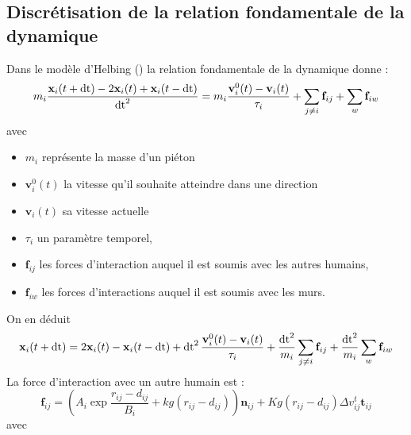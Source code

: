 \subsection{Discrétisation de la relation fondamentale de la dynamique}
%
\label{samuel2}
Dans le modèle d'Helbing (\cite{lemercier}) la relation fondamentale de la dynamique donne :
%
\[
m_i\frac{\mathbf{x}_i(t+\operatorname{dt}) - 2\mathbf{x}_i(t) + \mathbf{x}_i(t-\operatorname{dt})}{\operatorname{dt}^2} = m_i \frac{\mathbf{v}^0_i(t) - \mathbf{v}_i(t)}{\tau _i} + \sum_{j\neq i}\mathbf{f}_{ij} + \sum_{w}\mathbf{f}_{iw}
\]
avec
\begin{itemize}[leftmargin=1cm, label=, itemsep=0pt]%
\item  $m_i$ représente la masse d'un piéton
\item  $\mathbf{v}^0_i(t)$ la vitesse qu'il souhaite atteindre dans une direction
\item  $\mathbf{v}_i(t)$ sa vitesse actuelle
\item  $\tau_i$ un paramètre temporel,
\item  $\mathbf{f}_{ij}$ les forces d'interaction auquel il est soumis avec les autres humains,
\item  $\mathbf{f}_{iw}$ les forces d'interactions auquel il est soumis avec les murs.
\end{itemize}
On en déduit
\[
\mathbf{x}_i(t+\operatorname{dt}) = 2\mathbf{x}_i(t) - \mathbf{x}_i(t-\operatorname{dt}) + \operatorname{dt}^2  \frac{\mathbf{v}^0_i(t) - \mathbf{v}_i(t)}{\tau _i} + \frac{\operatorname{dt}^2}{m_i} \sum_{j\neq i}\mathbf{f}_{ij} + \frac{\operatorname{dt}^2}{m_i} \sum_{w}\mathbf{f}_{iw}
\]
La force d'interaction avec un autre humain est :
%
\[
\mathbf{f}_{ij} = \left( A_i \exp{\frac{r_{ij}-d_{ij}}{B_i}} + kg(r_{ij}-d_{ij})\right) \mathbf{n}_{ij} + Kg(r_{ij}-d_{ij})\Delta v^t_{ij}\mathbf{t}_{ij}
\]
%
avec
